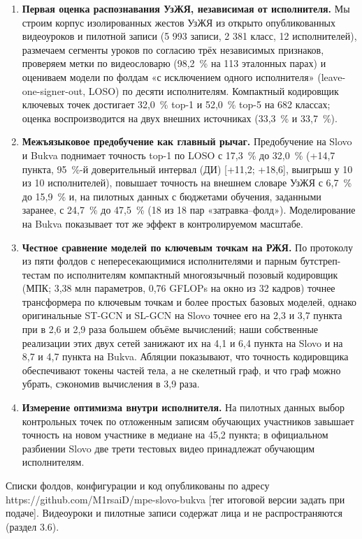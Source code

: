 \documentclass[a4paper,fleqn]{cas-dc}
\providecommand{\tightlist}{\setlength{\itemsep}{0pt}\setlength{\parskip}{0pt}}
\begin{document}
\begin{enumerate}
\def\labelenumi{\arabic{enumi}.}
\tightlist
\item
  \textbf{Первая оценка распознавания УзЖЯ, независимая от исполнителя.} Мы строим корпус изолированных жестов УзЖЯ из открыто опубликованных видеоуроков и пилотной записи (5 993 записи, 2 381 класс, 12 исполнителей), размечаем сегменты уроков по согласию трёх независимых признаков, проверяем метки по видеословарю (98,2~\% на 113 эталонных парах) и оцениваем модели по фолдам «с исключением одного исполнителя» (leave-one-signer-out, LOSO) по десяти исполнителям. Компактный кодировщик ключевых точек достигает 32,0~\% top-1 и 52,0~\% top-5 на 682 классах; оценка воспроизводится на двух внешних источниках (33,3~\% и 33,7~\%).
\item
  \textbf{Межъязыковое предобучение как главный рычаг.} Предобучение на Slovo и Bukva поднимает точность top-1 по LOSO с 17,3~\% до 32,0~\% (+14,7 пункта, 95~\%-й доверительный интервал (ДИ) {[}+11,2; +18,6{]}, выигрыш у 10 из 10 исполнителей), повышает точность на внешнем словаре УзЖЯ с 6,7~\% до 15,9~\% и, на пилотных данных с бюджетами обучения, заданными заранее, с 24,7~\% до 47,5~\% (18 из 18 пар «затравка--фолд»). Моделирование на Bukva показывает тот же эффект в контролируемом масштабе.
\item
  \textbf{Честное сравнение моделей по ключевым точкам на РЖЯ.} По протоколу из пяти фолдов с непересекающимися исполнителями и парным бутстреп-тестам по исполнителям компактный многоязычный позовый кодировщик (МПК; 3,38 млн параметров, 0,76 GFLOPs на окно из 32 кадров) точнее трансформера по ключевым точкам и более простых базовых моделей, однако оригинальные ST-GCN \cite{2018_yan_stgcn} и SL-GCN \cite{2021_jiang_sam_slr} на Slovo точнее его на 2,3 и 3,7 пункта при в 2,6 и 2,9 раза большем объёме вычислений; наши собственные реализации этих двух сетей занижают их на 4,1 и 6,4 пункта на Slovo и на 8,7 и 4,7 пункта на Bukva. Абляции показывают, что точность кодировщика обеспечивают токены частей тела, а не скелетный граф, и что граф можно убрать, сэкономив вычисления в 3,9 раза.
\item
  \textbf{Измерение оптимизма внутри исполнителя.} На пилотных данных выбор контрольных точек по отложенным записям обучающих участников завышает точность на новом участнике в медиане на 45,2 пункта; в официальном разбиении Slovo две трети тестовых видео принадлежат обучающим исполнителям.
\end{enumerate}

Списки фолдов, конфигурации и код опубликованы по адресу https://github.com/M1rsaiD/mpe-slovo-bukva {\color{red}[тег итоговой версии задать при подаче]}. Видеоуроки и пилотные записи содержат лица и не распространяются (раздел 3.6).
\end{document}
